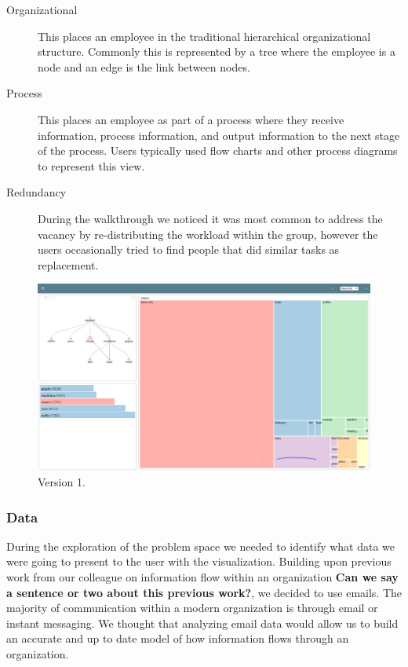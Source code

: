 \documentclass[journal]{vgtc}                %
\begin{document}
\begin{description}
\item [Organizational] This places an employee in the traditional hierarchical organizational structure.  Commonly this is represented by a tree where the employee is a node and an edge is the link between nodes.
\item [Process] This places an employee as part of a process where they receive information, process information, and output information to the next stage of the process.  Users typically used flow charts and other process diagrams to represent this view.
\item [Redundancy] During the walkthrough we noticed it was most common to address the vacancy by re-distributing the workload within the group, however the users occasionally tried to find people that did similar tasks as replacement.
\end{description}
\begin{figure}
  \centering
  \includegraphics[width=\columnwidth]{pictures/version1.JPG}
  \caption{Version 1. }
  \label{fig:version1}
\end{figure}
      

\subsubsection{Data}
During the exploration of the problem space we needed to identify what data we were going to present to the user with the visualization.  Building upon previous work from our colleague on information flow within an organization \textbf{{\color{Plum}Can we say a sentence or two about this previous work?}}, we decided to use emails.  The majority of communication within a modern organization is through email or instant messaging.  We thought that analyzing email data would allow us to build an accurate and up to date model of how information flows through an organization.  
\end{document}
